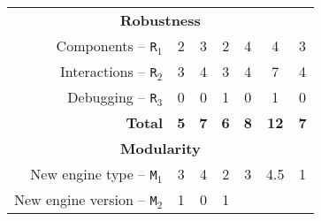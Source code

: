 \documentclass[preprint,3p,twocolumn]{elsarticle}
\begin{document}
\begin{table*}
\begin{tabular}{rcccccc}
\multicolumn{7}{c}{\cellcolor[HTML]{EEEEEE}\textbf{Robustness}}\\
Components  --   \texttt{R$_1$}      & \cellcolor[HTML]{99FF99}2
                                     & \cellcolor[HTML]{99DD99}3
                                     & \cellcolor[HTML]{99FF99}2
                                     & \cellcolor[HTML]{99AA99}4  
                                     & \cellcolor[HTML]{99AA99}4 
                                     & \cellcolor[HTML]{99AA99}3 \\
Interactions -- \texttt{R$_2$}       & \cellcolor[HTML]{99FF99}3    
                                     & \cellcolor[HTML]{99DD99}4
                                     & \cellcolor[HTML]{99DD99}3      
                                     & \cellcolor[HTML]{99AA99}4  
                                     & \cellcolor[HTML]{99AA99}7      
                                     & \cellcolor[HTML]{99AA99}4 \\
Debugging --    \texttt{R$_3$}       & \cellcolor[HTML]{99AA99}0          
                                     & \cellcolor[HTML]{99FF99}0
                                     & \cellcolor[HTML]{99AA99}1
                                     & \cellcolor[HTML]{99FF99}0
                                     & \cellcolor[HTML]{99AA99}1
                                     & \cellcolor[HTML]{99FF99}0 \\
\textbf{Total}                       & \cellcolor[HTML]{99FF99}\textbf{5}
                                     & \cellcolor[HTML]{99CC99}\textbf{7}
                                     & \cellcolor[HTML]{99CC99}\textbf{6}
                                     & \cellcolor[HTML]{99BB99}\textbf{8}
                                     & \cellcolor[HTML]{99AA99}\textbf{12}
                                     & \cellcolor[HTML]{99BB99}\textbf{7} \\
\multicolumn{7}{c}{\cellcolor[HTML]{EEEEEE}\textbf{Modularity}}\\
New engine type -- \texttt{M$_1$}    & \cellcolor[HTML]{99AA99}3
                                     & \cellcolor[HTML]{99DD99}4
                                     & \cellcolor[HTML]{99FF99}2
                                     & \cellcolor[HTML]{99DD99}3
                                     & \cellcolor[HTML]{99DD99}4.5
                                     & \cellcolor[HTML]{99AA99}1 \\
New engine version -- \texttt{M$_2$} & \cellcolor[HTML]{99AA99}1
                                     & \cellcolor[HTML]{99FF99}0
                                     & \cellcolor[HTML]{99FF99}1

\end{tabular}
\end{table*}
\end{document}
